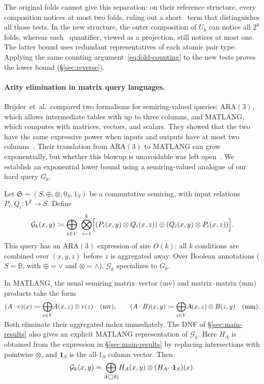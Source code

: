 The original folds cannot give this separation: on their reference
structure, every composition notices at most two folds, ruling out a
short \CoR\ term that distinguishes all those tests. In the new
structure, the outer composition of $U_k$ can notice all $2^k$ folds,
whereas each \FOtwo\ quantifier, viewed as a projection, still notices
at most one. The latter bound uses redundant representatives of each
atomic pair type. Applying the same counting argument~\eqref{eq:fold-counting}
to the new tests proves the lower bound (\S\ref{sec:reverse}).

\paragraph{Arity elimination in matrix query languages.}
Brijder~et~al.\ compared two formalisms for semiring-valued queries:
ARA$(3)$, which allows intermediate tables with up to three columns,
and MATLANG, which computes with matrices, vectors, and scalars.
They showed that the two have the same expressive power when inputs
and outputs have at most two columns~\cite{brijder2022}.
Their translation from ARA$(3)$ to MATLANG can grow exponentially,
but whether this blowup is unavoidable was left open~\citep[p.~9]{brijder2019}.
We establish an exponential lower bound using a semiring-valued
analogue of our hard query $G_k$.

Let $\mathfrak S=(S,\oplus,\otimes,0_S,1_S)$ be a commutative semiring,
with input relations $P_i,Q_i:V^2\to S$. Define
\[
  \mathcal G_k(x,y)\coloneqq
  \bigoplus_{z\in V}\ \bigotimes_{i=1}^k
  \Bigl[(P_i(x,y)\otimes Q_i(x,z))
  \oplus(Q_i(x,y)\otimes P_i(x,z))\Bigr].
\]
This query has an ARA$(3)$ expression of size $O(k)$: all $k$
conditions are combined over $(x,y,z)$ before $z$ is aggregated away.
Over Boolean annotations ($S=\mathbb B$, with $\oplus=\lor$ and
$\otimes=\land$), $\mathcal G_k$ specializes to $G_k$.

In MATLANG, the usual semiring matrix--vector (mv) and matrix--matrix
(mm) products take the form
\[
  (A \cdot v)(x) \coloneqq \smash{\bigoplus_{z\in V}} A(x,z)\otimes v(z)
  \quad\text{(mv)},\qquad
  (A \cdot B)(x,y) \coloneqq \smash{\bigoplus_{z\in V}} A(x,z)\otimes B(z,y)
  \quad\text{(mm)}.
\]

Both eliminate their aggregated index immediately.
The DNF of \S\ref{sec:main-results} also gives an explicit MATLANG
representation of $\mathcal G_k$. Here $H_A$ is obtained from the expression in \S\ref{sec:main-results}
by replacing intersections with pointwise $\otimes$, and
$\mathbf 1_S$ is the all-$1_S$ column vector. Then
\[
  \mathcal G_k(x,y)=\smash{\bigoplus_{A\subseteq[k]}}
       H_A(x,y)\otimes (H_{A^c}\mathbf \cdot \mathbf{1}_S)(x).
\]

